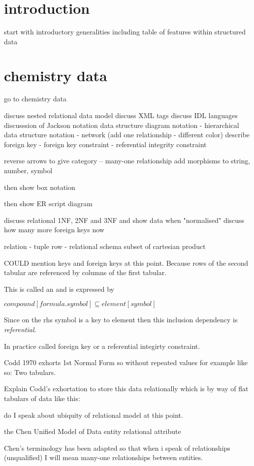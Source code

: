 \documentclass[10pt,a4paper]{article}
\theoremstyle{remark}
\begin{document}
\section{introduction}
start with introductory generalities including table of features within structured data

\section{chemistry data}
go to chemistry data

discuss nested relational data model discuss XML tags discuss IDL languages
discusssion of Jackson notation
data structure diagram notation - hierarchical
data structure notation         - network (add one relationship - different color)
describe foreign key - foreign key constraint - referential integrity constraint

reverse arrows to give category -- many-one relationship
add morphisms to string, number, symbol

then show box notation 

then show ER script diagram

discuss relational 1NF, 2NF and 3NF and
show data when "normalised"
 discuss how many more foreign keys now

relation - tuple row - relational schema subset of cartesian product

COULD mention keys and foreign keys at this point. Because rows of the second tabular are referenced by columns of the first tabular.

This is called an 
  and is expressed by 

$compound[formula.symbol] \subseteq element[symbol]$

Since on the rhs symbol is a key to element then this inclusion dependency is \textit{referential}.

In practice called foreign key or a referential integirty constraint.

Codd 1970 exhorts 1st Normal Form so without repeated values for example like so:
Two tabulars.

Explain Codd's exhortation to store this data relationally which is by way of flat tabulars of data like this:


do I speak about ubiquity of relational model at this point.

the Chen Unified Model of Data entity relational attribute

Chen's terminology has been adapted so that when i speak of relationships (unqualified) I will mean many-one relationships between entities.
\end{document}
